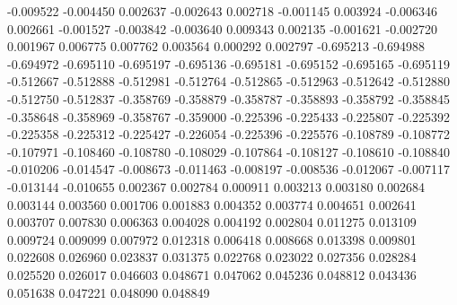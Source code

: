 -0.009522
-0.004450
0.002637
-0.002643
0.002718
-0.001145
0.003924
-0.006346
0.002661
-0.001527
-0.003842
-0.003640
0.009343
0.002135
-0.001621
-0.002720
0.001967
0.006775
0.007762
0.003564
0.000292
0.002797
-0.695213
-0.694988
-0.694972
-0.695110
-0.695197
-0.695136
-0.695181
-0.695152
-0.695165
-0.695119
-0.512667
-0.512888
-0.512981
-0.512764
-0.512865
-0.512963
-0.512642
-0.512880
-0.512750
-0.512837
-0.358769
-0.358879
-0.358787
-0.358893
-0.358792
-0.358845
-0.358648
-0.358969
-0.358767
-0.359000
-0.225396
-0.225433
-0.225807
-0.225392
-0.225358
-0.225312
-0.225427
-0.226054
-0.225396
-0.225576
-0.108789
-0.108772
-0.107971
-0.108460
-0.108780
-0.108029
-0.107864
-0.108127
-0.108610
-0.108840
-0.010206
-0.014547
-0.008673
-0.011463
-0.008197
-0.008536
-0.012067
-0.007117
-0.013144
-0.010655
0.002367
0.002784
0.000911
0.003213
0.003180
0.002684
0.003144
0.003560
0.001706
0.001883
0.004352
0.003774
0.004651
0.002641
0.003707
0.007830
0.006363
0.004028
0.004192
0.002804
0.011275
0.013109
0.009724
0.009099
0.007972
0.012318
0.006418
0.008668
0.013398
0.009801
0.022608
0.026960
0.023837
0.031375
0.022768
0.023022
0.027356
0.028284
0.025520
0.026017
0.046603
0.048671
0.047062
0.045236
0.048812
0.043436
0.051638
0.047221
0.048090
0.048849
